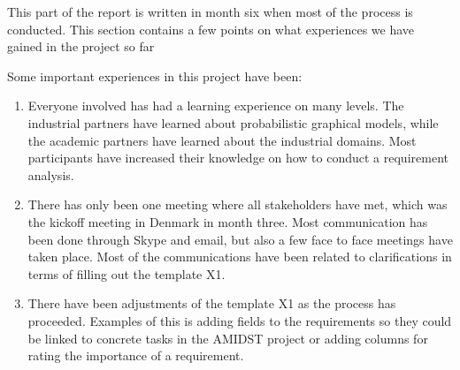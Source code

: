 \documentclass[11pt, oneside]{article}   	%
\begin{document}
This part of the report is written in month six when most of the process is conducted.  This section contains a few points on what experiences we have gained in the project so far

Some important experiences in this project have been:

\begin{enumerate}
\item Everyone involved has had a learning experience on many levels.  The industrial partners have learned about probabilistic graphical models, while the academic partners have learned about the industrial domains.  Most participants have increased their knowledge on how to conduct a requirement analysis. 
\item There has only been one meeting where all stakeholders have met, which was the kickoff meeting in Denmark in month three.  Most communication has been done through Skype and email, but also a few face to face meetings have taken place. Most of the communications have been related to clarifications in terms of filling out the template X1.
\item There have been adjustments of the template X1 as the process has proceeded.  Examples of this is adding fields to the requirements so they could be linked to concrete tasks in the AMIDST project or adding columns for rating the importance of a requirement.
\end{enumerate}












\end{document}

